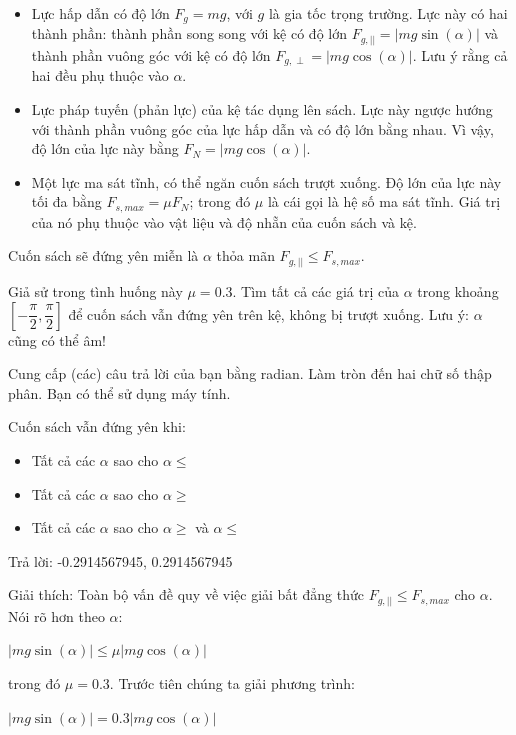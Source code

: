\documentclass[12pt,a4paper]{article}
\begin{document}
\begin{itemize}
    \item Lực hấp dẫn có độ lớn \(F_{g}=mg\), với \(g\) là gia tốc trọng trường. Lực này có hai thành phần: thành phần song song với kệ có độ lớn \(F_{g,||}=|mg\sin (\alpha )|\) và thành phần vuông góc với kệ có độ lớn \(F_{g,\perp }=|mg\cos (\alpha )|\). Lưu ý rằng cả hai đều phụ thuộc vào \(\alpha \).
    \item Lực pháp tuyến (phản lực) của kệ tác dụng lên sách. Lực này ngược hướng với thành phần vuông góc của lực hấp dẫn và có độ lớn bằng nhau. Vì vậy, độ lớn của lực này bằng \(F_{N}=|mg\cos (\alpha )|\).
    \item Một lực ma sát tĩnh, có thể ngăn cuốn sách trượt xuống. Độ lớn của lực này tối đa bằng \(F_{s,max}=\mu F_{N}\); trong đó \(\mu \) là cái gọi là hệ số ma sát tĩnh. Giá trị của nó phụ thuộc vào vật liệu và độ nhẵn của cuốn sách và kệ.
\end{itemize}

Cuốn sách sẽ đứng yên miễn là \(\alpha \) thỏa mãn \(F_{g,||}\le F_{s,max}\).

Giả sử trong tình huống này \(\mu =0.3\). Tìm tất cả các giá trị của \(\alpha \) trong khoảng \([-\dfrac{\pi }{2},\dfrac{\pi }{2}]\) để cuốn sách vẫn đứng yên trên kệ, không bị trượt xuống. Lưu ý: \(\alpha \) cũng có thể âm!

Cung cấp (các) câu trả lời của bạn bằng radian. Làm tròn đến hai chữ số thập phân. Bạn có thể sử dụng máy tính.

Cuốn sách vẫn đứng yên khi:

\begin{itemize}
    \item Tất cả các \(\alpha \) sao cho \(\alpha \le \)
    \item Tất cả các \(\alpha \) sao cho \(\alpha \ge \)
    \item Tất cả các \(\alpha \) sao cho \(\alpha \ge \) và \(\alpha \le \)
\end{itemize}

Trả lời: -0.2914567945, 0.2914567945

Giải thích: Toàn bộ vấn đề quy về việc giải bất đẳng thức \(F_{g,||}\le F_{s,max}\) cho \(\alpha \). Nói rõ hơn theo \(\alpha \):

\(|mg\sin (\alpha )|\le \mu |mg\cos (\alpha )|\)

trong đó \(\mu =0.3\). Trước tiên chúng ta giải phương trình:

\(|mg\sin (\alpha )|=0.3|mg\cos (\alpha )|\)
\end{document}
